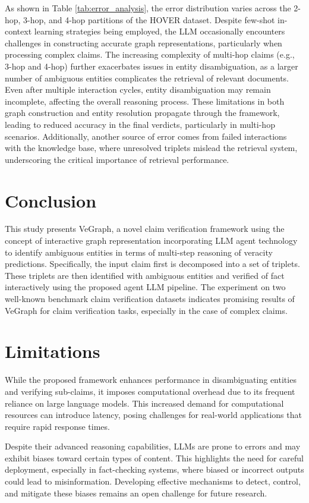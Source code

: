 \documentclass[11pt]{article}
\begin{document}
As shown in Table \ref{tab:error_analysis}, the error distribution varies across the 2-hop, 3-hop, and 4-hop partitions of the HOVER dataset. Despite few-shot in-context learning strategies being employed, the LLM occasionally encounters challenges in constructing accurate graph representations, particularly when processing complex claims. The increasing complexity of multi-hop claims (e.g., 3-hop and 4-hop) further exacerbates issues in entity disambiguation, as a larger number of ambiguous entities complicates the retrieval of relevant documents. Even after multiple interaction cycles, entity disambiguation may remain incomplete, affecting the overall reasoning process. These limitations in both graph construction and entity resolution propagate through the framework, leading to reduced accuracy in the final verdicts, particularly in multi-hop scenarios. Additionally, another source of error comes from failed interactions with the knowledge base, where unresolved triplets mislead the retrieval system, underscoring the critical importance of retrieval performance.

\section{Conclusion}
This study presents VeGraph, a novel claim verification framework using the concept of interactive graph representation incorporating LLM agent technology to identify ambiguous entities in terms of multi-step reasoning of veracity predictions. Specifically, the input claim first is decomposed into a set of triplets. These triplets are then identified with ambiguous entities and verified of fact interactively using the proposed agent LLM pipeline. The experiment on two well-known benchmark claim verification datasets indicates promising results of VeGraph for claim verification tasks, especially in the case of complex claims. 

\section*{Limitations}
While the proposed framework enhances performance in disambiguating entities and verifying sub-claims, it imposes computational overhead due to its frequent reliance on large language models. This increased demand for computational resources can introduce latency, posing challenges for real-world applications that require rapid response times.

Despite their advanced reasoning capabilities, LLMs are prone to errors and may exhibit biases toward certain types of content. This highlights the need for careful deployment, especially in fact-checking systems, where biased or incorrect outputs could lead to misinformation. Developing effective mechanisms to detect, control, and mitigate these biases remains an open challenge for future research.
\end{document}
